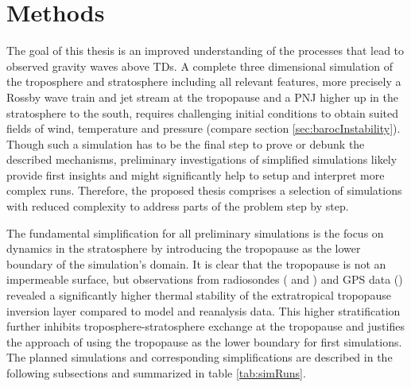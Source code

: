 \section{Methods}
\label{sec:methods}




The goal of this thesis is an improved understanding of the processes that lead to observed gravity waves above TDs. A complete three dimensional simulation of the troposphere and stratosphere including all relevant features, more precisely a Rossby wave train and jet stream at the tropopause and a PNJ higher up in the stratosphere to the south, requires challenging initial conditions to obtain suited fields of wind, temperature and pressure (compare section \ref{sec:barocInstability}). Though such a simulation has to be the final step to prove or debunk the described mechanisms, preliminary investigations of simplified simulations likely provide first insights and might significantly help to setup and interpret more complex runs. Therefore, the proposed thesis comprises a selection of simulations with reduced complexity to address parts of the problem step by step.

The fundamental simplification for all preliminary simulations is the focus on dynamics in the stratosphere by introducing the tropopause as the lower boundary of the simulation's domain. It is clear that the tropopause is not an impermeable surface, but observations from radiosondes (\cite{birner_how_2002} and \cite{birner_fine-scale_2006}) and GPS data (\cite{randel_extratropical_2007}) revealed a significantly higher thermal stability of the extratropical tropopause inversion layer compared to model and reanalysis data. This higher stratification further inhibits troposphere-stratosphere exchange at the tropopause and justifies the approach of using the tropopause as the lower boundary for first simulations. The planned simulations and corresponding simplifications are described in the following subsections and summarized in table \ref{tab:simRuns}.

